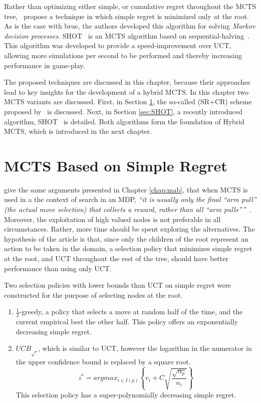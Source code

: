 \documentclass{kecsmstr}
\begin{document}
Rather than optimizing either simple, or cumulative regret throughout the MCTS tree,~ propose a technique in which simple regret is minimized only at the root. As is the case with {\sc brue}, the authors developed this algorithm for solving \emph{Markov decision processes}. SHOT~ is an MCTS algorithm based on sequential-halving~. This algorithm was developed to provide a speed-improvement over UCT, allowing more simulations per second to be performed and thereby increasing performance in game-play. 

\vspace{2 mm}
The proposed techniques are discussed in this chapter, because their approaches lead to key insights for the development of a hybrid MCTS. In this chapter two MCTS variants are discussed. First, in Section \ref{sec:srmcts}, the so-called (SR+CR) scheme proposed by~ is discussed. Next, in Section \ref{sec:SHOT}, a recently introduced algorithm, SHOT~ is detailed. Both algorithms form the foundation of Hybrid MCTS, which is introduced in the next chapter.
\newpage
\section{MCTS Based on Simple Regret}
\label{sec:srmcts}

 give the same arguments presented in Chapter \ref{chap:mab}, that when MCTS is used in a the context of search in an MDP, \emph{``it is usually only the final ``arm pull'' (the actual move selection) that collects a reward, rather than all ``arm pulls''''}~. Moreover, the exploitation of high valued nodes is not preferable in all circumstances. Rather, more time should be spent exploring the alternatives. The hypothesis of the article is that, since only the children of the root represent an action to be taken in the domain, a selection policy that minimizes simple regret at the root, and UCT throughout the rest of the tree, should have better performance than using only UCT.

Two selection policies with lower bounds than UCT on simple regret were constructed for the purpose of selecting nodes at the root.
\begin{enumerate}
\item $\frac{1}{2}$-greedy, a policy that selects a move at random half of the time, and the current empirical best the other half. This policy offers an exponentially decreasing simple regret.
\item ${UCB}_{\sqrt{.}}$, which is similar to UCT, however the logarithm in the numerator in the upper confidence bound is replaced by a square root.
\begin{equation}
\label{eq:uctsqrt}
i^* = argmax_{i \in I(p)}\left\{ v_i + C \sqrt{ \frac{\sqrt{n_p}}{n_i}}\right\}
\end{equation}
This selection policy has a super-polynomially decreasing simple regret.
\end{enumerate}
\end{document}
